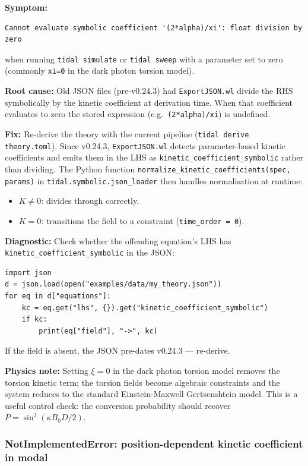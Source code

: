 \textbf{Symptom:}
\begin{lstlisting}[style=python]
Cannot evaluate symbolic coefficient '(2*alpha)/xi': float division by zero
\end{lstlisting}
when running \texttt{tidal simulate} or \texttt{tidal sweep} with a parameter set to
zero (commonly \texttt{xi=0} in the dark photon torsion model).

\textbf{Root cause:} Old JSON files (pre-v0.24.3) had \texttt{ExportJSON.wl} divide
the RHS symbolically by the kinetic coefficient at derivation time.  When that
coefficient evaluates to zero the stored expression (e.g.\ \texttt{(2*alpha)/xi}) is
undefined.

\textbf{Fix:} Re-derive the theory with the current pipeline
(\texttt{tidal derive theory.toml}).  Since v0.24.3, \texttt{ExportJSON.wl} detects
parameter-based kinetic coefficients and emits them in the LHS as
\texttt{kinetic\_coefficient\_symbolic} rather than dividing.  The Python function
\texttt{normalize\_kinetic\_coefficients(spec, params)} in
\texttt{tidal.symbolic.json\_loader} then handles normalisation at runtime:
\begin{itemize}
  \item $K \neq 0$: divides through correctly.
  \item $K = 0$: transitions the field to a constraint (\texttt{time\_order = 0}).
\end{itemize}

\textbf{Diagnostic:} Check whether the offending equation's LHS has
\texttt{kinetic\_coefficient\_symbolic} in the JSON:
\begin{lstlisting}[style=python]
import json
d = json.load(open("examples/data/my_theory.json"))
for eq in d["equations"]:
    kc = eq.get("lhs", {}).get("kinetic_coefficient_symbolic")
    if kc:
        print(eq["field"], "->", kc)
\end{lstlisting}
If the field is absent, the JSON pre-dates v0.24.3 --- re-derive.

\textbf{Physics note:} Setting $\xi = 0$ in the dark photon torsion model removes the
torsion kinetic term; the torsion fields become algebraic constraints and the system
reduces to the standard Einstein-Maxwell Gertsenshtein model.  This is a useful
control check: the conversion probability should recover $P = \sin^2(\kappa B_0 D/2)$.

\subsubsection{NotImplementedError: position-dependent kinetic coefficient in modal}
\label{sec:troubleshooting-posdep-kinetic-modal}

